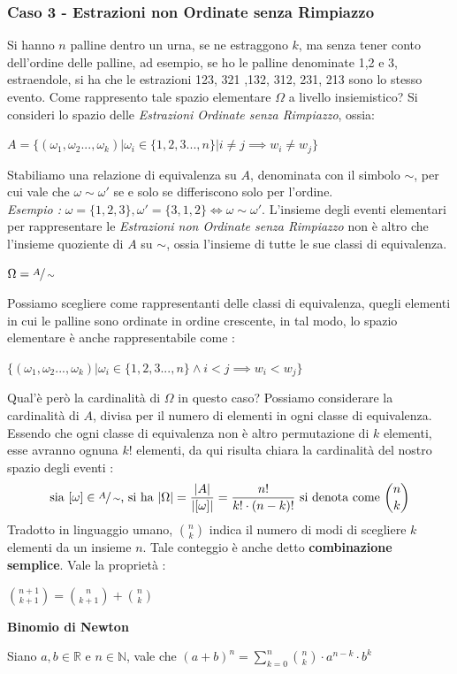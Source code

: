 \documentclass[12pt, letterpaper]{article}
\begin{document}
 \subsubsection{Caso 3 - Estrazioni non Ordinate senza Rimpiazzo}
 Si hanno \(n\) palline dentro un urna, se ne estraggono \(k\), ma senza tener conto dell'ordine delle palline, ad esempio,
 se ho le palline denominate 1,2 e 3, estraendole, si ha che le estrazioni 123, 321 ,132, 312, 231, 213 sono 
 lo stesso evento. Come rappresento tale spazio elementare \(\Omega\) a livello insiemistico? Si consideri lo spazio 
 delle \textit{Estrazioni Ordinate senza Rimpiazzo}, ossia:\begin{center} \( A  =\{(\omega_1,\omega_2...,
    \omega_k) | \omega_i \in \{1,2,3...,n\}|i\ne j \implies w_i\ne w_j\}\) \end{center}
Stabiliamo una relazione di equivalenza su \(A\), denominata con il simbolo \(\sim \), per cui 
vale che \(\omega\sim \omega'\) se e solo se differiscono solo per l'ordine. \\\textit{Esempio :}
\(\omega=\{1,2,3\},\omega'=\{3,1,2\}\iff \omega\sim \omega'\).
L'insieme degli eventi elementari per rappresentare le \textit{Estrazioni non Ordinate senza Rimpiazzo}
non è altro che l'insieme quoziente di \(A\) su \(\sim\), ossia l'insieme di tutte le sue classi di 
equivalenza.\begin{center}
    \(\displaystyle\Omega=\displaystyle\sfrac A\sim\)
\end{center}
Possiamo scegliere come rappresentanti delle classi di equivalenza, quegli elementi in cui le palline 
sono ordinate in ordine crescente, in tal modo, lo spazio elementare è anche rappresentabile come :
\begin{center}
    \(
        \{(\omega_1,\omega_2...,\omega_k)|\omega_i \in \{1,2,3...,n\} \land i<j\implies w_i < w_j\}
    \)
\end{center}
Qual'è però la cardinalità di \(\Omega\) in questo caso? Possiamo considerare la cardinalità di \(A\), divisa 
per il numero di elementi in ogni classe di equivalenza. Essendo che ogni classe di equivalenza non è altro
permutazione di \(k\) elementi, esse avranno ognuna \(k!\) elementi, da qui risulta chiara la cardinalità del 
nostro spazio degli eventi :
\begin{equation}
    \text{sia } [\omega]\in \sfrac{A}{\sim} \text{,  si ha  } |\Omega|=\dfrac{|A|}{|[\omega]|}=\dfrac{n!}{k!\cdot(n-k)!} \text{ si denota come }\binom{n}{k} 
\end{equation}
Tradotto in linguaggio umano, \(\binom{n}{k}\) indica il numero di modi di scegliere \(k\) elementi da un insieme \(n\). Tale
conteggio è anche detto \textbf{combinazione semplice}.
Vale la proprietà : \begin{center}
    \(\displaystyle\binom{n+1}{k+1}=\binom{n}{k+1}+\binom{n}{k}\)
\end{center}
\large \textbf{Binomio di Newton}\\\begin{center}
\normalsize Siano \(a,b \in \mathbb{R}\) e \(n\in\mathbb{N}\), vale che \(
    \displaystyle(a+b)^n = \sum_{k=0}^{n}\binom{n}{k}\cdot a^{n-k}\cdot b^k
\)\end{center}
\end{document}
